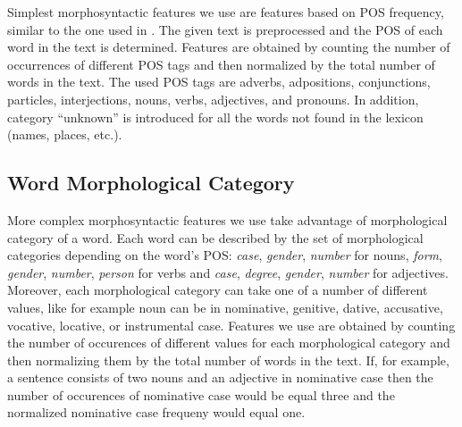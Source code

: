 \documentclass{llncs}
\begin{document}
Simplest morphosyntactic features we use are features based on POS frequency,
similar to the one used in \cite{kukushkina2001using}. The given text is
preprocessed and the POS of each word in the text is determined. Features are
obtained by counting the number of occurrences of different POS tags and then
normalized by the total number of words in the text. The used POS tags are
adverbs, adpositions, conjunctions, particles, interjections, nouns, verbs,
adjectives, and pronouns. In addition, category ``unknown'' is introduced for all
the words not found in the lexicon (names, places, etc.).

\subsection{Word Morphological Category}
\label{sec:morphosyntactic}

More complex morphosyntactic features we use take advantage of morphological
category of a word. Each word can be described by the set of morphological
categories depending on the word's POS: \emph{case}, \emph{gender}, \emph{number}
for nouns, \emph{form}, \emph{gender}, \emph{number}, \emph{person} for verbs and
\emph{case}, \emph{degree}, \emph{gender}, \emph{number} for adjectives.
Moreover, each morphological category can take one of a number of different
values, like for example noun can be in nominative, genitive, dative, accusative, vocative,
locative, or instrumental case. Features we use are obtained by counting the
number of occurences of different values for each morphological category and
then normalizing them by the total number of words in the text. If, for example,
a sentence consists of two nouns and an adjective in nominative case then the
number of occurences of nominative case would be equal three and the normalized
nominative case frequeny would equal one.
\end{document}
